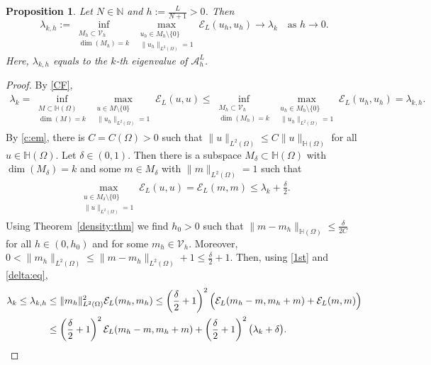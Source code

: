 \documentclass[11 pt]{article}
\newtheorem{proposition}[theorem]{Proposition}
\numberwithin{equation}{section}
\def\mH{\mathbb{H}}
\begin{document}
\begin{proposition}\label{prop:eigen-approx}
Let $N\in \mathbb N$ and $h:=\frac{L}{N+1}>0$. Then
$$
\lambda_{k,h}:=\inf_{\substack{M_h\subset \mathcal{V}_{h}\\ \dim(M_h)=k}} \max_{\substack{u_h\in M_h\setminus\{0\}\\ \|u_h\|_{L^2(\Omega)}=1}} \mathcal{E}_L(u_h,u_h)\to \lambda_k\quad\text{as $h\to 0$.}
$$
Here, $\lambda_{k,h}$ equals to the $k$-th eigenvalue of $\mathcal{A}^L_{h}$.
\end{proposition}
\begin{proof}
By \eqref{CF}, 
\begin{align}\label{1st}
\lambda_k=\inf_{\substack{M\subset \mH(\Omega)\\ \dim(M)=k}} \max_{\substack{u\in M\setminus\{0\}\\ \|u_h\|_{L^2(\Omega)}=1}} \mathcal{E}_L(u,u)\leq \inf_{\substack{M_h\subset \mathcal{V}_{h}\\ \dim(M_h)=k}} \max_{\substack{u_h\in M_h\setminus\{0\}\\ \|u_h\|_{L^2(\Omega)}=1}} \mathcal{E}_L(u_h,u_h)=\lambda_{k,h}.
\end{align}
 By \eqref{c:em}, there is $C=C(\Omega)>0$ such that $\|u\|_{L^2(\Omega)}\leq C\|u\|_{\mH(\Omega)}$ for all $u\in \mH(\Omega)$. Let  $\delta\in(0,1)$. Then there is a subspace $M_{\delta}\subset \mH(\Omega)$ with $\dim(M_{\delta})=k$ and some $m\in M_{\delta}$ with $\|m\|_{L^2(\Omega)}=1$ such that
\begin{align}\label{delta:eq}
\max_{\substack{ u\in M_{\delta}\setminus \{0\}\\ \|u\|_{L^2(\Omega)}=1}} \mathcal{E}_L(u,u)=\mathcal{E}_{L}(m,m)\leq \lambda_k+\frac{\delta}{2}. 
\end{align}
Using Theorem~\ref{density:thm} we find $h_0>0$ such that $\|m-m_h\|_{\mH(\Omega)}\leq \frac{\delta}{2C}$ for all $h\in(0,h_0)$ and for some $m_h\in {\mathcal V}_h$. Moreover, $0<\|m_h\|_{L^2(\Omega)}\leq \|m-m_h\|_{L^2(\Omega)}+1\leq \frac{\delta}{2}+1
$. Then, using \eqref{1st} and \eqref{delta:eq},
\begin{align}\notag 
\lambda_{k}\leq \lambda_{k,h}&\leq \|m_h\|_{L^2(\Omega)}^2 \mathcal{E}_L(m_h,m_h)\leq \left( \frac{\delta}{2}+1\right)^2\Big(\mathcal{E}_L(m_h-m,m_h+m)+\mathcal{E}_L(m,m)\Big)\notag\\
&\leq \left( \frac{\delta}{2}+1\right)^2\mathcal{E}_L(m_h-m,m_h+m)
+\left( \frac{\delta}{2}+1\right)^2\big(\lambda_k+\delta\big).\label{lambda-k-upperbound}
\end{align}

\end{proof}
\end{document}
